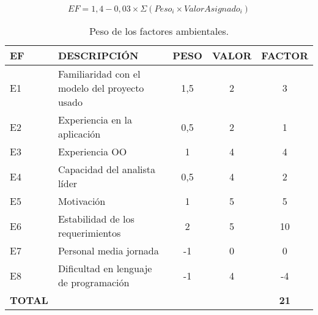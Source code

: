 \begin{equation} \label{eq:ef}
  EF = 1,4 - 0,03 \times \Sigma (Peso_i \times ValorAsignado_i)
\end{equation}

\begin{table}[h]
\begin{center}
\begin{tabular}{l l c c c}
\textbf{EF} & \textbf{DESCRIPCIÓN} & \textbf{PESO} & \textbf{VALOR} & \textbf{FACTOR}\\ \hline \hline
E1	&	Familiaridad con el modelo del proyecto usado	&	1,5	&	2	&	3	\\
E2	&	Experiencia en la aplicación	&	0,5	&	2	&	1	\\
E3	&	Experiencia OO	&	1	&	4	&	4	\\
E4	&	Capacidad del analista líder	&	0,5	&	4	&	2	\\
E5	&	Motivación	&	1	&	5	&	5	\\
E6	&	Estabilidad de los requerimientos	&	2	&	5	&	10	\\
E7	&	Personal media jornada	&	-1	&	0	&	0	\\
E8	&	Dificultad en lenguaje de programación	&	-1	&	4	&	-4	\\ \hline
\textbf{TOTAL} & & & & \textbf{21}\\ \hline \hline
\end{tabular}
\caption{Peso de los factores ambientales.}
\label{tab:ef}
\end{center}
\end{table}

